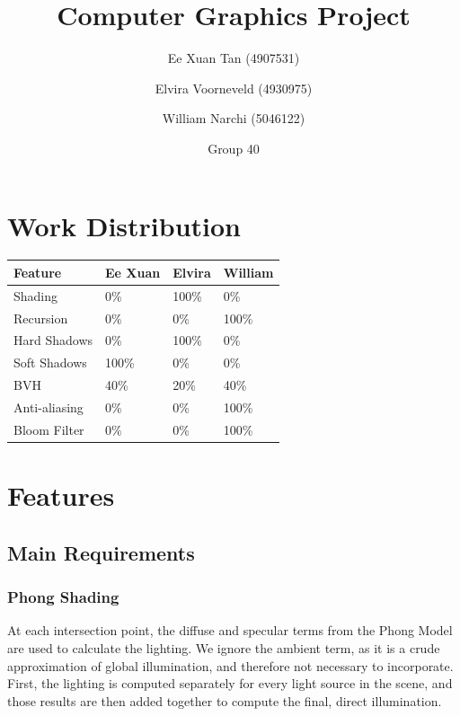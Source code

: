 \documentclass{article}
\author{Ee Xuan Tan (4907531) \and Elvira Voorneveld (4930975) \and William Narchi (5046122)}
\date{Group 40} %
\title{Computer Graphics Project}
\begin{document}
    \maketitle

    \section{Work Distribution}
    
    \begin{tabular}{ |p{2.5cm}||p{2.5cm}|p{2.5cm}|p{2.5cm}| }
        \hline
        \textbf{Feature} &\textbf{Ee Xuan} &\textbf{Elvira} &\textbf{William}\\
        \hline
        Shading         &0\%    &100\%  &0\%\\
        Recursion       &0\%    &0\%    &100\%\\
        Hard Shadows    &0\%    &100\%  &0\%\\
        Soft Shadows    &100\%  &0\%    &0\%\\
        BVH             &40\%  &20\%    &40\%\\
        Anti-aliasing   &0\%    &0\%    &100\%\\
        Bloom Filter    &0\%    &0\%    &100\%\\
        \hline
    \end{tabular}

    \section{Features}
    \subsection{Main Requirements}
    \subsubsection{Phong Shading}
    At each intersection point, the diffuse and specular terms from the Phong Model are used to calculate the lighting.
    We ignore the ambient term, as it is a crude approximation of global illumination, and therefore not necessary to incorporate.
    First, the lighting is computed separately for every light source in the scene, 
    and those results are then added together to compute the final, direct illumination.
\end{document}
